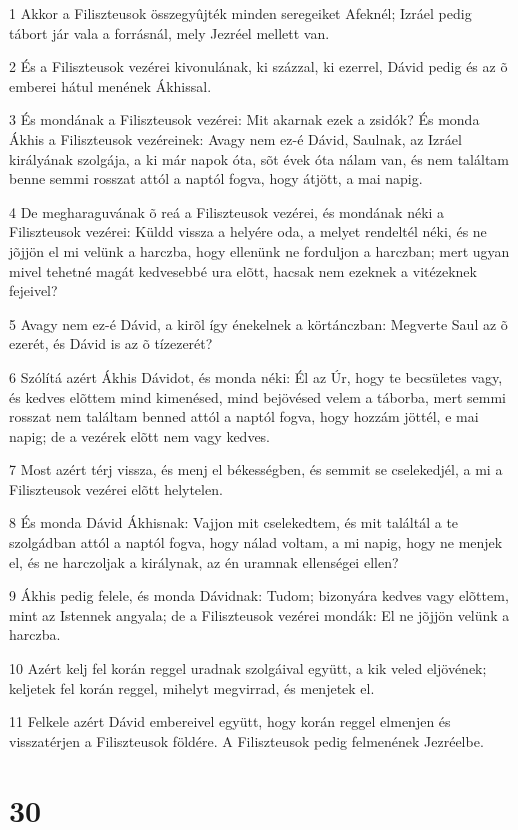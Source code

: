 \par 1 Akkor a Filiszteusok összegyûjték minden seregeiket Afeknél; Izráel pedig tábort jár vala a forrásnál, mely Jezréel mellett van.
\par 2 És a Filiszteusok vezérei kivonulának, ki százzal, ki ezerrel, Dávid pedig és az õ emberei hátul menének Ákhissal.
\par 3 És mondának a Filiszteusok vezérei: Mit akarnak ezek a zsidók? És monda Ákhis a Filiszteusok vezéreinek: Avagy nem ez-é Dávid, Saulnak, az Izráel királyának szolgája, a ki már napok óta, sõt évek óta nálam van, és nem találtam benne semmi rosszat attól a naptól fogva, hogy átjött, a mai napig.
\par 4 De megharaguvának õ reá a Filiszteusok vezérei, és mondának néki a Filiszteusok vezérei: Küldd vissza a helyére oda, a melyet rendeltél néki, és ne jõjjön el mi velünk a harczba, hogy ellenünk ne forduljon a harczban; mert ugyan mivel tehetné magát kedvesebbé ura elõtt, hacsak nem ezeknek a vitézeknek fejeivel?
\par 5 Avagy nem ez-é Dávid, a kirõl így énekelnek a körtánczban: Megverte Saul az õ ezerét, és Dávid is az õ tízezerét?
\par 6 Szólítá azért Ákhis Dávidot, és monda néki: Él az Úr, hogy te becsületes vagy, és kedves elõttem mind kimenésed, mind bejövésed velem a táborba, mert semmi rosszat nem találtam benned attól a naptól fogva, hogy hozzám jöttél, e mai napig; de a vezérek elõtt nem vagy kedves.
\par 7 Most azért térj vissza, és menj el békességben, és semmit se cselekedjél, a mi a Filiszteusok vezérei elõtt helytelen.
\par 8 És monda Dávid Ákhisnak: Vajjon mit cselekedtem, és mit találtál a te szolgádban attól a naptól fogva, hogy nálad voltam, a mi napig, hogy ne menjek el, és ne harczoljak a királynak, az én uramnak ellenségei ellen?
\par 9 Ákhis pedig felele, és monda Dávidnak: Tudom; bizonyára kedves vagy elõttem, mint az Istennek angyala; de a Filiszteusok vezérei mondák: El ne jõjjön velünk a harczba.
\par 10 Azért kelj fel korán reggel uradnak szolgáival együtt, a kik veled eljövének; keljetek fel korán reggel, mihelyt megvirrad, és menjetek el.
\par 11 Felkele azért Dávid embereivel együtt, hogy korán reggel elmenjen és visszatérjen a Filiszteusok földére. A Filiszteusok pedig felmenének Jezréelbe.

\chapter{30}

